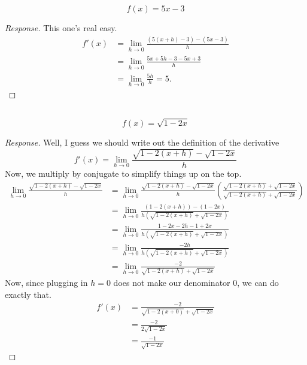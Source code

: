 \documentclass[english]{article}
\newcommand{\prt}[1]{\setcounter{subsection}{#1-1}\subsection{}}
\theoremstyle{remark}
\theoremstyle{definition}
\newcommand{\resp}[1]{\begin{proof}[Response]{#1}\end{proof}}
\begin{document}
	\prt{1} $$f(x)=5x-3$$
	\resp{This one's real easy.
\begin{align*}
	f'(x)&=\lim_{h\to 0}\frac{(5(x+h)-3)-(5x-3)}{h}\\
	&=\lim_{h\to 0}\frac{5x+5h-3-5x+3}{h}\\
	&=\lim_{h\to 0}\frac{5h}{h}=5.
\end{align*}	
}
	\prt{2} $$f(x)=\sqrt{1-2x}$$
	\resp{
Well, I guess we should write out the definition of the derivative\textellipsis
$$f'(x)=\lim_{h\to 0}\frac{\sqrt{1-2(x+h)}-\sqrt{1-2x}}{h}$$
Now, we multiply by conjugate to simplify things up on the top.	\begin{align*}
\lim_{h\to 0}\frac{\sqrt{1-2(x+h)}-\sqrt{1-2x}}{h}&=\lim_{h\to 0}\frac{\sqrt{1-2(x+h)}-\sqrt{1-2x}}{h}\left(\frac{\sqrt{1-2(x+h)}+\sqrt{1-2x}}{\sqrt{1-2(x+h)}+\sqrt{1-2x}}\right)\\
&=\lim_{h\to 0}\frac{(1-2(x+h))-(1-2x)}{h(\sqrt{1-2(x+h)}+\sqrt{1-2x})}\\&=\lim_{h\to 0}\frac{1-2x-2h-1+2x}{h(\sqrt{1-2(x+h)}+\sqrt{1-2x})}\\&=\lim_{h\to 0}\frac{-2h}{h(\sqrt{1-2(x+h)}+\sqrt{1-2x})}\\
&=\lim_{h\to 0}\frac{-2}{\sqrt{1-2(x+h)}+\sqrt{1-2x}}
\end{align*}
Now, since plugging in $h=0$ does not make our denominator 0, we can do exactly that.
\begin{align*}
	f'(x)&=\frac{-2}{\sqrt{1-2(x+0)}+\sqrt{1-2x}}\\&=\frac{-2}{2\sqrt{1-2x}}\\&=\frac{-1}{\sqrt{1-2x}}
\end{align*}
}
	
\end{document}
